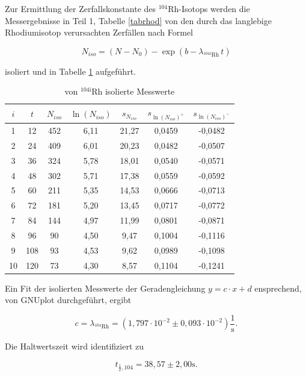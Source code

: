 Zur Ermittlung der Zerfallskonstante des $^{104}$Rh-Isotops werden die Messergebnisse in Teil 1, Tabelle \ref{tabrhod} von den durch das langlebige
Rhodiumisotop verursachten Zerfällen nach Formel

\begin{equation}
 N_{iso} = (N-N_0) - \exp(b-\lambda_{^{104\text{i}}\text{Rh}}\,t)
\end{equation}

isoliert und in Tabelle \ref{tabrhod2} aufgeführt.

\begin{table}[H]
 \begin{tabular}{c|c|c|c|c|c|c}
 $i$ & $t$ & $N_{iso}$ & $\ln(N_{iso})$ & $s_{N_{iso}}$ & $s_{\ln(N_{iso})^+}$ & $s_{\ln(N_{iso})^-}$ \\
 \hline
1&	12&	452&	6,11&	21,27&	0,0459&	-0,0482 \\
2&	24&	409&	6,01&	20,23&	0,0482&	-0,0507\\
3&	36&	324&	5,78&	18,01&	0,0540&	-0,0571\\
4&	48&	302&	5,71&	17,38&	0,0559&	-0,0592\\
5&	60&	211&	5,35&	14,53&	0,0666&	-0,0713\\
6&	72&	181&	5,20&	13,45&	0,0717&	-0,0772\\
7&	84&	144&	4,97&	11,99&	0,0801&	-0,0871\\
8&	96&	90&	4,50&	9,47&	0,1004&	-0,1116\\
9&	108&	93&	4,53&	9,62&	0,0989&	-0,1098\\
10&	120&	73&	4,30&	8,57&	0,1104&	-0,1241\\
 \end{tabular}
 \caption{von $^{104\text{i}}$Rh isolierte Messwerte}
 \label{tabrhod2}
\end{table}

Ein Fit der isolierten Messwerte der Geradengleichung $y = c\cdot x + d$ ensprechend, von GNUplot durchgeführt, ergibt 

\begin{equation}
 c = \lambda_{^{104}\text{Rh}} = (1,797\cdot 10^{-2} \pm 0,093 \cdot 10^{-2}) \frac{1}{\text{s}}.
\end{equation}

Die Haltwertszeit wird identifiziert zu

\begin{equation}
   t_{\frac12,\text{104}} = 38,57 \pm 2,00 \text{s}.
\label{rh2} 
\end{equation}


